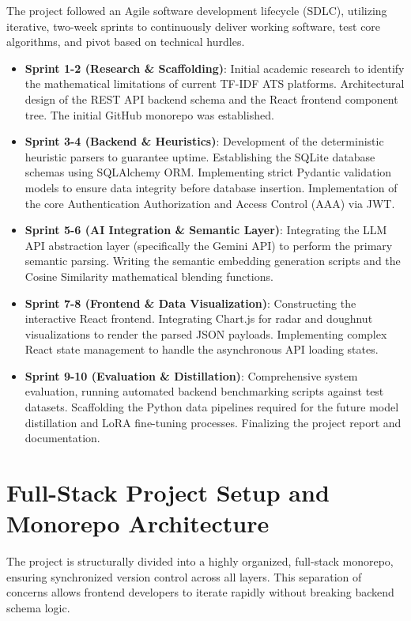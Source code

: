 \documentclass[12pt,a4paper]{report}
\begin{document}
The project followed an Agile software development lifecycle (SDLC), utilizing iterative, two-week sprints to continuously deliver working software, test core algorithms, and pivot based on technical hurdles.

\begin{itemize}
    \item \textbf{Sprint 1-2 (Research \& Scaffolding)}: Initial academic research to identify the mathematical limitations of current TF-IDF ATS platforms. Architectural design of the REST API backend schema and the React frontend component tree. The initial GitHub monorepo was established.
    \item \textbf{Sprint 3-4 (Backend \& Heuristics)}: Development of the deterministic heuristic parsers to guarantee uptime. Establishing the SQLite database schemas using SQLAlchemy ORM. Implementing strict Pydantic validation models to ensure data integrity before database insertion. Implementation of the core Authentication Authorization and Access Control (AAA) via JWT.
    \item \textbf{Sprint 5-6 (AI Integration \& Semantic Layer)}: Integrating the LLM API abstraction layer (specifically the Gemini API) to perform the primary semantic parsing. Writing the semantic embedding generation scripts and the Cosine Similarity mathematical blending functions.
    \item \textbf{Sprint 7-8 (Frontend \& Data Visualization)}: Constructing the interactive React frontend. Integrating Chart.js for radar and doughnut visualizations to render the parsed JSON payloads. Implementing complex React state management to handle the asynchronous API loading states.
    \item \textbf{Sprint 9-10 (Evaluation \& Distillation)}: Comprehensive system evaluation, running automated backend benchmarking scripts against test datasets. Scaffolding the Python data pipelines required for the future model distillation and LoRA fine-tuning processes. Finalizing the project report and documentation.
\end{itemize}

\section{Full-Stack Project Setup and Monorepo Architecture}

The project is structurally divided into a highly organized, full-stack monorepo, ensuring synchronized version control across all layers. This separation of concerns allows frontend developers to iterate rapidly without breaking backend schema logic.
\end{document}
